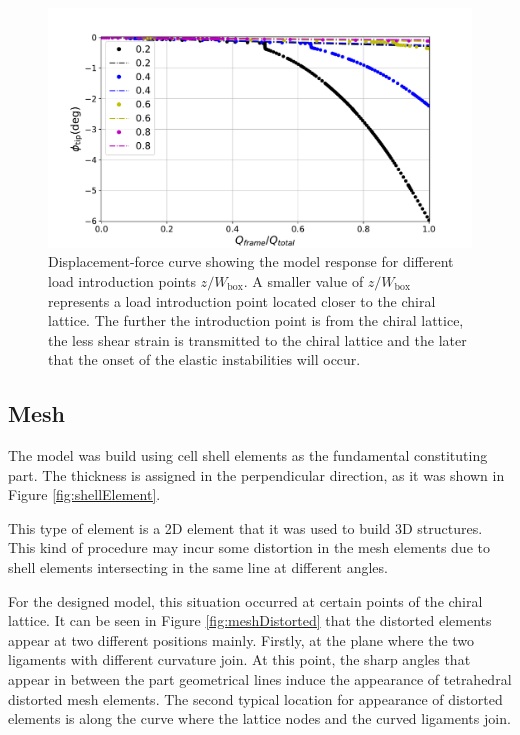     \begin{figure}[!htpb]
      \centering
      \includegraphics[width=0.8 \textwidth]{../figures/result-model/forceDisplacement-loadZ0coma8}
      \caption[Displacement-force curve showing the model response for different load introduction points $z/W_{\mathrm{box}}$]{Displacement-force curve showing the model response for different load introduction points $z/W_{\mathrm{box}}$. A smaller value of $z/W_{\mathrm{box}}$ represents a load introduction point located closer to the chiral lattice. The further the introduction point is from the chiral lattice, the less shear strain is transmitted to the chiral lattice and the later that the onset of the elastic instabilities will occur.}
      \label{fig:forceDisplacement-loadZ0coma8}
    \end{figure}

  \clearpage
  \subsection{Mesh} \label{subsec:mesh_results_model}

    The model was build using cell shell elements as the fundamental constituting part. The thickness is assigned in the perpendicular direction, as it was shown in Figure \ref{fig:shellElement}.

    This type of element is a 2D element that it was used to build 3D structures. This kind of procedure may incur some distortion in the mesh elements due to shell elements intersecting in the same line at different angles.

    For the designed model, this situation occurred at certain points of the chiral lattice. It can be seen in Figure \ref{fig:meshDistorted} that the distorted elements appear at two different positions mainly. Firstly, at the plane where the two ligaments with different curvature join. At this point, the sharp angles that appear in between the part geometrical lines induce the appearance of tetrahedral distorted mesh elements. The second typical location for appearance of distorted elements is along the curve where the lattice nodes and the curved ligaments join.

